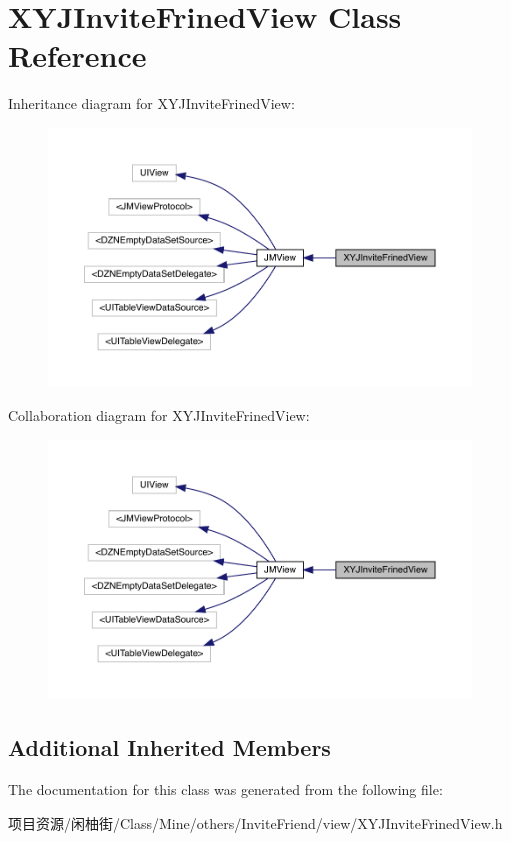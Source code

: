 \hypertarget{interface_x_y_j_invite_frined_view}{}\section{X\+Y\+J\+Invite\+Frined\+View Class Reference}
\label{interface_x_y_j_invite_frined_view}


Inheritance diagram for X\+Y\+J\+Invite\+Frined\+View\+:\nopagebreak
\begin{figure}[H]
\begin{center}
\leavevmode
\includegraphics[width=350pt]{interface_x_y_j_invite_frined_view__inherit__graph}
\end{center}
\end{figure}


Collaboration diagram for X\+Y\+J\+Invite\+Frined\+View\+:\nopagebreak
\begin{figure}[H]
\begin{center}
\leavevmode
\includegraphics[width=350pt]{interface_x_y_j_invite_frined_view__coll__graph}
\end{center}
\end{figure}
\subsection*{Additional Inherited Members}


The documentation for this class was generated from the following file\+:\begin{DoxyCompactItemize}
\item 
项目资源/闲柚街/\+Class/\+Mine/others/\+Invite\+Friend/view/X\+Y\+J\+Invite\+Frined\+View.\+h\end{DoxyCompactItemize}
